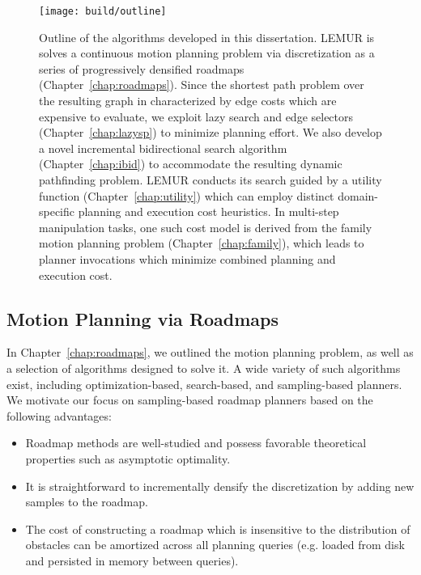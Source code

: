 \begin{figure}[t]
   \centering
   \texttt{[image: build/outline]}
   \caption{Outline of the algorithms developed in this dissertation.
      LEMUR is solves a continuous motion planning problem via
      discretization as a series of progressively densified roadmaps
      (Chapter~\ref{chap:roadmaps}).
      Since the shortest path problem over the resulting graph
      in characterized by edge costs which are expensive to evaluate,
      we exploit lazy search and edge selectors
      (Chapter~\ref{chap:lazysp}) to minimize planning effort.
      We also develop a novel incremental bidirectional search
      algorithm (Chapter~\ref{chap:ibid}) to accommodate the resulting
      dynamic pathfinding problem.
      LEMUR conducts its search guided by a utility function
      (Chapter~\ref{chap:utility}) which can employ distinct
      domain-specific planning and execution cost heuristics.
      In multi-step manipulation tasks,
      one such cost model is derived from the family motion planning
      problem (Chapter~\ref{chap:family}),
      which leads to planner invocations which minimize combined
      planning and execution cost.
      }
   \label{fig:conclusion:outline}
\end{figure}

\subsection{Motion Planning via Roadmaps}

In Chapter~\ref{chap:roadmaps},
we outlined the motion planning problem,
as well as a selection of algorithms designed to solve it.
A wide variety of such algorithms exist,
including optimization-based, search-based, and sampling-based
planners.
We motivate our focus on sampling-based roadmap planners
based on the following advantages:
\begin{itemize}
\item Roadmap methods are well-studied and possess favorable
   theoretical properties such as asymptotic optimality.
\item It is straightforward to incrementally densify the
   discretization by adding new samples to the roadmap.
\item The cost of constructing a roadmap which is
   insensitive to the distribution of obstacles can be amortized
   across all planning queries
   (e.g. loaded from disk and persisted in memory between queries).
\end{itemize}

